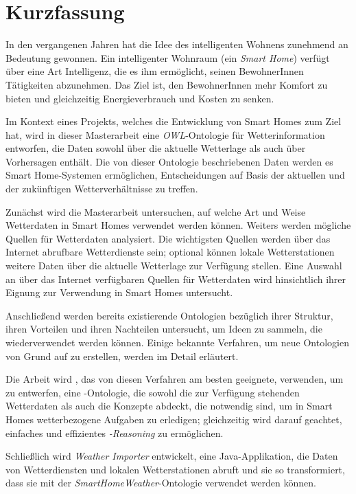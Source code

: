 \chapter*{Kurzfassung}

In den vergangenen Jahren hat die Idee des intelligenten Wohnens zunehmend an Bedeutung gewonnen. Ein intelligenter Wohnraum (ein \emph{Smart Home}) verfügt über eine Art Intelligenz, die es ihm ermöglicht, seinen BewohnerInnen Tätigkeiten abzunehmen. Das Ziel ist, den Bewoh\-nerInnen mehr Komfort zu bieten und gleichzeitig Energieverbrauch und Kosten zu senken.

Im Kontext eines Projekts, welches die Entwicklung von Smart Homes zum Ziel hat, wird in dieser Masterarbeit eine \emph{OWL}-Ontologie für Wetterinformation entworfen, die Daten sowohl über die aktuelle Wetterlage als auch über Vorhersagen enthält. Die von dieser Ontologie beschriebenen Daten werden es Smart Home-Systemen ermöglichen, Entscheidungen auf Basis der aktuellen und der zukünftigen Wetterverhältnisse zu treffen.

Zunächst wird die Masterarbeit untersuchen, auf welche Art und Weise Wetterdaten in Smart Homes verwendet werden können. Weiters werden mögliche Quellen für Wetterdaten analysiert. Die wichtigsten Quellen werden über das Internet abrufbare Wetterdienste sein; optional können lokale Wetterstationen weitere Daten über die aktuelle Wetterlage zur Verfügung stellen. Eine Auswahl an über das Internet verfügbaren Quellen für Wetterdaten wird hinsichtlich ihrer Eignung zur Verwendung in Smart Homes untersucht.

Anschließend werden bereits existierende Ontologien bezüglich ihrer Struktur, ihren Vorteilen und ihren Nachteilen untersucht, um Ideen zu sammeln, die wiederverwendet werden können. Einige bekannte Verfahren, um neue Ontologien von Grund auf zu erstellen, werden im Detail erläutert.

Die Arbeit wird \methontology, das von diesen Verfahren am besten geeignete, verwenden, um \smarthomeweather zu entwerfen, eine -Ontologie, die sowohl die zur Verfügung stehenden Wetterdaten als auch die Konzepte abdeckt, die notwendig sind, um in Smart \mbox{Homes} wetterbezogene Aufgaben zu erledigen; gleichzeitig wird darauf geachtet, einfaches und effizientes \emph{-Reasoning} zu ermöglichen.

Schließlich wird \emph{Weather Importer} entwickelt, eine Java-Applikation, die Daten von Wetterdiensten und lokalen Wetterstationen abruft und sie so transformiert, dass sie mit der \emph{Smart\-Home\-Weather}-Ontologie verwendet werden können.